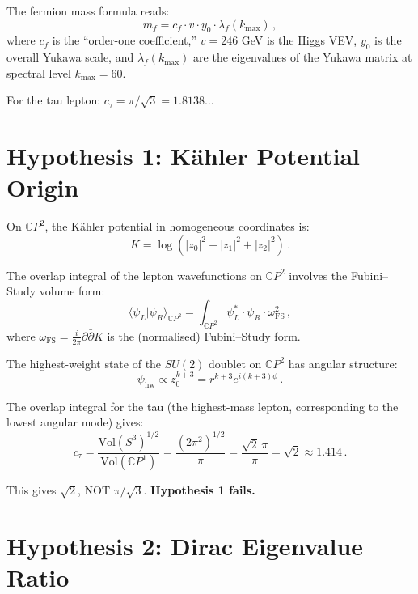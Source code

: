 \documentclass[11pt,a4paper]{article}
\newcommand{\CP}{\mathbb{C}P}
\begin{document}
The fermion mass formula reads:
\begin{equation}
m_f = c_f \cdot v \cdot y_0 \cdot \lambda_f(k_{\max})\,,
\end{equation}
where $c_f$ is the ``order-one coefficient,'' $v = 246$ GeV is the Higgs VEV, $y_0$ is the overall Yukawa scale, and $\lambda_f(k_{\max})$ are the eigenvalues of the Yukawa matrix at spectral level $k_{\max} = 60$.

For the tau lepton: $c_\tau = \pi/\sqrt{3} = 1.8138\ldots$

\section{Hypothesis 1: K\"ahler Potential Origin}

On $\CP^2$, the K\"ahler potential in homogeneous coordinates is:
\begin{equation}
K = \log(|z_0|^2 + |z_1|^2 + |z_2|^2)\,.
\end{equation}

The overlap integral of the lepton wavefunctions on $\CP^2$ involves the Fubini--Study volume form:
\begin{equation}
\langle \psi_L | \psi_R \rangle_{\CP^2} = \int_{\CP^2} \psi_L^* \cdot \psi_R \cdot \omega_{\mathrm{FS}}^2\,,
\end{equation}
where $\omega_{\mathrm{FS}} = \frac{i}{2\pi}\partial\bar{\partial}K$ is the (normalised) Fubini--Study form.

The highest-weight state of the $SU(2)$ doublet on $\CP^2$ has angular structure:
\begin{equation}
\psi_{\mathrm{hw}} \propto z_0^{k+3} = r^{k+3} e^{i(k+3)\phi}\,.
\end{equation}

The overlap integral for the tau (the highest-mass lepton, corresponding to the lowest angular mode) gives:
\begin{equation}
c_\tau = \frac{\mathrm{Vol}(S^3)^{1/2}}{\mathrm{Vol}(\CP^1)} = \frac{(2\pi^2)^{1/2}}{\pi} = \frac{\sqrt{2}\,\pi}{\pi} = \sqrt{2} \approx 1.414\,.
\end{equation}

This gives $\sqrt{2}$, NOT $\pi/\sqrt{3}$. \textbf{Hypothesis 1 fails.}

\section{Hypothesis 2: Dirac Eigenvalue Ratio}
\end{document}

